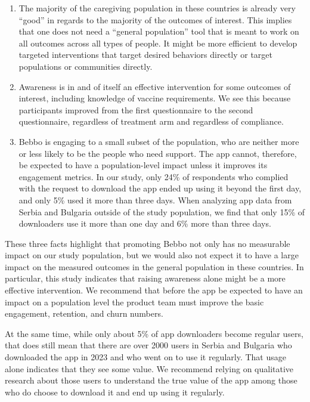 \documentclass{article}
\begin{document}
\begin{enumerate}
\item The majority of the caregiving population in these countries is already very “good” in regards to the majority of the outcomes of interest. This implies that one does not need a ``general population'' tool that is meant to work on all outcomes across all types of people. It might be more efficient to develop targeted interventions that target desired behaviors directly or target populations or communities directly.
\item Awareness is in and of itself an effective intervention for some outcomes of interest, including knowledge of vaccine requirements. We see this because participants improved from the first questionnaire to the second questionnaire, regardless of treatment arm and regardless of compliance.
\item Bebbo is engaging to a small subset of the population, who are neither more or less likely to be the people who need support. The app cannot, therefore, be expected to have a population-level impact unless it improves its engagement metrics. In our study, only 24\% of respondents who complied with the request to download the app ended up using it beyond the first day, and only 5\% used it more than three days. When analyzing app data from Serbia and Bulgaria outside of the study population, we find that only 15\% of downloaders use it more than one day and 6\% more than three days.
\end{enumerate}

These three facts highlight that promoting Bebbo not only has no measurable impact on our study population, but we would also not expect it to have a large impact on the measured outcomes in the general population in these countries. In particular, this study indicates that raising awareness alone might be a more effective intervention. We recommend that before the app be expected to have an impact on a population level the product team must improve the basic engagement, retention, and churn numbers.

At the same time, while only about 5\% of app downloaders become regular users, that does still mean that there are over 2000 users in Serbia and Bulgaria who downloaded the app in 2023 and who went on to use it regularly. That usage alone indicates that they see some value. We recommend relying on qualitative research about those users to understand the true value of the app among those who do choose to download it and end up using it regularly.
\end{document}
